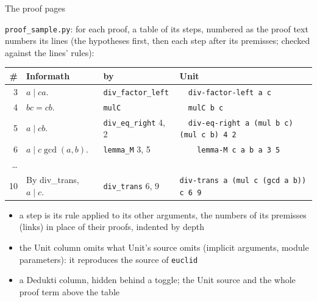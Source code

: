 \documentclass[10pt,aspectratio=169]{beamer}
\newcommand{\file}[1]{\texttt{#1}}
\begin{document}
\begin{frame}[fragile]{The proof pages}

\footnotesize
\file{proof\_sample.py}: for each proof, a table of its steps,
numbered as the proof text numbers its lines (the hypotheses first, then
each step after its premisses; checked against the lines' rules):

\vspace{1mm}
\scriptsize
\begin{tabular}{rp{}lp{}}
\toprule
\# & Informath & by & Unit \\
\midrule
3 & $a\mid ca$. & \texttt{div\_factor\_left} & \texttt{\ \ div-factor-left a c} \\
4 & $bc = cb$. & \texttt{mulC} & \texttt{\ \ mulC b c} \\
5 & $a\mid cb$. & \texttt{div\_eq\_right} 4, 2 & \texttt{\ \ div-eq-right a (mul b c) (mul c b) 4 2} \\
6 & $a\mid c\gcd(a,b)$. & \texttt{lemma\_M} 3, 5 & \texttt{\ \ \ \ lemma-M c a b a 3 5} \\
\ldots \\
10 & By div\_trans, $a\mid c$. & \texttt{div\_trans} 6, 9 & \texttt{div-trans a (mul c (gcd a b)) c 6 9} \\
\bottomrule
\end{tabular}

\vspace{1mm}
\footnotesize
\begin{itemize}
\item a step is its rule applied to its other arguments, the numbers of
  its premisses (links) in place of their proofs, indented by depth
\item the Unit column omits what Unit's source omits (implicit arguments,
  module parameters): it reproduces the source of \texttt{euclid}
\item a Dedukti column, hidden behind a toggle; the Unit source and the
  whole proof term above the table
\end{itemize}

\end{frame}
\end{document}
